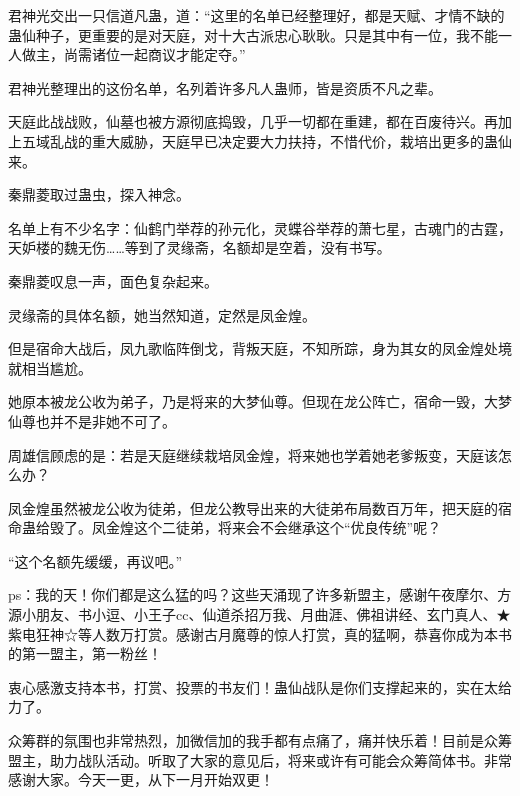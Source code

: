 \begin{this_body}
君神光交出一只信道凡蛊，道：“这里的名单已经整理好，都是天赋、才情不缺的蛊仙种子，更重要的是对天庭，对十大古派忠心耿耿。只是其中有一位，我不能一人做主，尚需诸位一起商议才能定夺。”

君神光整理出的这份名单，名列着许多凡人蛊师，皆是资质不凡之辈。

天庭此战战败，仙墓也被方源彻底捣毁，几乎一切都在重建，都在百废待兴。再加上五域乱战的重大威胁，天庭早已决定要大力扶持，不惜代价，栽培出更多的蛊仙来。

秦鼎菱取过蛊虫，探入神念。

名单上有不少名字：仙鹤门举荐的孙元化，灵蝶谷举荐的萧七星，古魂门的古霆，天妒楼的魏无伤……等到了灵缘斋，名额却是空着，没有书写。

秦鼎菱叹息一声，面色复杂起来。

灵缘斋的具体名额，她当然知道，定然是凤金煌。

但是宿命大战后，凤九歌临阵倒戈，背叛天庭，不知所踪，身为其女的凤金煌处境就相当尴尬。

她原本被龙公收为弟子，乃是将来的大梦仙尊。但现在龙公阵亡，宿命一毁，大梦仙尊也并不是非她不可了。

周雄信顾虑的是：若是天庭继续栽培凤金煌，将来她也学着她老爹叛变，天庭该怎么办？

凤金煌虽然被龙公收为徒弟，但龙公教导出来的大徒弟布局数百万年，把天庭的宿命蛊给毁了。凤金煌这个二徒弟，将来会不会继承这个“优良传统”呢？

“这个名额先缓缓，再议吧。”

ps：我的天！你们都是这么猛的吗？这些天涌现了许多新盟主，感谢午夜摩尔、方源小朋友、书小逗、小王子cc、仙道杀招万我、月曲涯、佛祖讲经、玄门真人、★紫电狂神☆等人数万打赏。感谢古月魔尊的惊人打赏，真的猛啊，恭喜你成为本书的第一盟主，第一粉丝！

衷心感激支持本书，打赏、投票的书友们！蛊仙战队是你们支撑起来的，实在太给力了。

众筹群的氛围也非常热烈，加微信加的我手都有点痛了，痛并快乐着！目前是众筹盟主，助力战队活动。听取了大家的意见后，将来或许有可能会众筹简体书。非常感谢大家。今天一更，从下一月开始双更！

\end{this_body}

